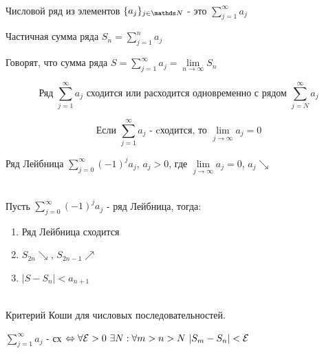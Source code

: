 \documentclass[matan]{subfiles}
\begin{document}
  \newpage
  \begin{Reminder} \
  \begin{definition}
      Числовой ряд из элементов $\{a_j\}_{j \in \N}$ - это $\sum\limits_{j=1}^\infty a_j$
  \end{definition}

  \begin{definition}
      Частичная сумма ряда $S_n = \sum\limits_{j=1}^n a_j$
  \end{definition}

  \begin{definition}
      Говорят, что сумма ряда $S=\sum\limits_{j=1}^\infty a_j=\lim\limits_{n \rightarrow \infty} S_n$
  \end{definition}

  \begin{Remark}
      \[\text{Ряд $\sum\limits_{j=1}^\infty a_j$ сходится или расходится одновременно с рядом $\sum\limits_{j=N}^\infty a_j$}\]
  \end{Remark}

  \begin{Theorem} 
      \[\text{Если $\sum\limits_{j=1}^\infty a_j$ - cходится, то $\lim\limits_{j \rightarrow \infty} a_j = 0$}\]
  \end{Theorem}

  \begin{definition}
      Ряд Лейбница $\sum\limits_{j=0}^\infty (-1)^j a_j$, $a_j>0$, где $\lim\limits_{j \rightarrow \infty} a_j =0$, $a_j \searrow$
  \end{definition}

  \begin{theorem}\ \\
      Пусть $\sum\limits_{j=0}^\infty (-1)^j a_j$ - ряд Лейбница, тогда:
      \begin{enumerate}
          \item Ряд Лейбница сходится
          \item $S_{2n} \searrow$, $S_{2n-1} \nearrow$
          \item $|S-S_n|<a_{n+1}$
      \end{enumerate}
  \end{theorem}

  \begin{theorem}\ \\
      Критерий Коши для числовых последовательностей.

      $\sum\limits_{j=1}^\infty a_j$ - сх $\Leftrightarrow \forall \mathcal{E} > 0\ \exists N: \forall m>n>N\ |S_m-S_n|<\mathcal{E}$
  \end{theorem}
  \end{Reminder}
\end{document}
